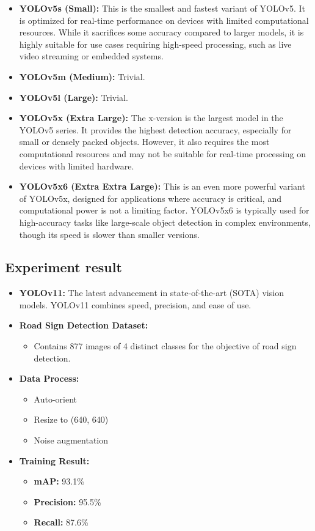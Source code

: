 \documentclass[letterpaper, 10 pt, conference]{ieeeconf}
\begin{document}
\begin{itemize}
    \item \textbf{YOLOv5s (Small):} This is the smallest and fastest variant of YOLOv5. It is optimized for real-time performance on devices with limited computational resources. While it sacrifices some accuracy compared to larger models, it is highly suitable for use cases requiring high-speed processing, such as live video streaming or embedded systems.
    \item \textbf{YOLOv5m (Medium):} Trivial.
    \item \textbf{YOLOv5l (Large):} Trivial.
    \item \textbf{YOLOv5x (Extra Large):} The x-version is the largest model in the YOLOv5 series. It provides the highest detection accuracy, especially for small or densely packed objects. However, it also requires the most computational resources and may not be suitable for real-time processing on devices with limited hardware.
    \item \textbf{YOLOv5x6 (Extra Extra Large):} This is an even more powerful variant of YOLOv5x, designed for applications where accuracy is critical, and computational power is not a limiting factor. YOLOv5x6 is typically used for high-accuracy tasks like large-scale object detection in complex environments, though its speed is slower than smaller versions.
\end{itemize}

\subsection{Experiment result}

\begin{itemize}
    \item \textbf{YOLOv11:} 
    The latest advancement in state-of-the-art (SOTA) vision models. YOLOv11 combines speed, precision, and ease of use.
    \item \textbf{Road Sign Detection Dataset:}
    \begin{itemize}
        \item Contains 877 images of 4 distinct classes for the objective of road sign detection. \cite{make_ml}
    \end{itemize}
    \item \textbf{Data Process:}
    \begin{itemize}
        \item Auto-orient
        \item Resize to (640, 640)
        \item Noise augmentation
    \end{itemize}
    \item \textbf{Training Result:}
    \begin{itemize}
        \item \textbf{mAP:} 93.1\%
        \item \textbf{Precision:} 95.5\%
        \item \textbf{Recall:} 87.6\%
    \end{itemize}
\end{itemize}
\end{document}
